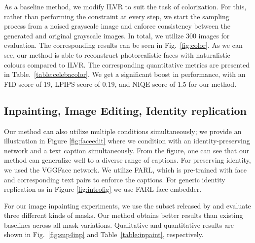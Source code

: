 \documentclass[10pt,twocolumn,letterpaper]{article}
\begin{document}
As a baseline method, we modify ILVR\cite{choi2021ilvr} to suit the task of colorization. For this, rather than performing the constraint at every step, we start the sampling process from a noised grayscale image and enforce consistency between the generated and original grayscale images. In total, we utilize 300 images for evaluation. The corresponding results can be seen in Fig.~\ref{fig:color}. As we can see, our method is able to reconstruct photorealistic faces with naturalistic colours compared to ILVR\cite{choi2021ilvr}. The corresponding quantitative metrics are presented in Table.~\ref{table:celebacolor}. We get a significant boost in performance, with an FID score of $19$, LPIPS\cite{zhang2018unreasonable} score of $0.19$, and NIQE\cite{mittal2012making} score of $1.5$ for our method.








\subsection{Inpainting, Image Editing, Identity replication}
Our method can also utilize multiple conditions simultaneously; we provide an illustration in Figure \ref{fig:faceedit} where we condition with an identity-preserving network and a text caption simultaneously. From the figure, one can see that our method can generalize well to a  diverse range of captions. For preserving identity, we used the VGGFace network\cite{Parkhi15}. We utilize FARL\cite{zheng2021farl}, which is pre-trained with face and corresponding text pairs to enforce the captions. For generic identity replication as in Figure \ref{fig:introfig} we use FARL face embedder.

For our image inpainting experiments, we use the subset released by \cite{suvorov2021resolution} and evaluate three different kinds of masks. Our method obtains better results than existing baselines across all mask variations. Qualitative and quantitative results are shown in Fig.~\ref{fig:sup4inp} and Table~\ref{table:inpaint}, respectively.
\end{document}
